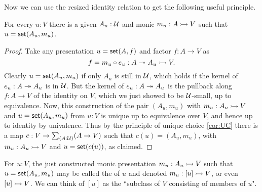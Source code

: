 Now we can use the resized identity relation to get the following useful principle.

\begin{lem}\label{lem:MonicSetPresent}
For every $u:V$ there is a given $A_u:\mathcal{U}$ and monic $m_u: A \rightarrowtail V$ such that $u = \mathsf{set}(A_u, m_u)$.
\end{lem}

\begin{proof}
Take any presentation $u = \mathsf{set}(A,f)$ and factor $f:A\to V$ as $$f = m_u\circ e_u : A \twoheadrightarrow A_u \rightarrowtail V.$$  Clearly $u = \mathsf{set}(A_u, m_u)$ if only $A_u$ is still in $\mathcal{U}$, which holds if the kernel of $e_u : A \twoheadrightarrow A_u$ is in $\mathcal{U}$.  But the kernel of $e_u : A \twoheadrightarrow A_u$ is the pullback along $f : A\to V$ of the identity on $V$, which we just showed to be $\mathcal{U}$-small, up to equivalence.  Now, this construction of the pair $(A_u, m_u)$ with $m_u :A_u \rightarrowtail V$ and $u = \mathsf{set}(A_u, m_u)$ from $u:V$ is unique up to equivalence over $V$, and hence up to identity by univalence.  Thus by the principle of unique choice \eqref{cor:UC} there is a map $c : V\to\sm{A:\UU}(A\to V)$ such that $c(u) = (A_u, m_u)$, with $m_u :A_u \rightarrowtail V$ and $u = \mathsf{set}(c(u))$, as claimed.
\end{proof}

\begin{defn}\label{def:TypeOfElements}
For $u:V$, the just constructed monic presentation $m_u: A_u \rightarrowtail V$ such that $u = \mathsf{set}(A_u, m_u)$ may be called the  of $u$ and denoted $m_u : [u] \rightarrowtail V$, or even $[u] \rightarrowtail V$.  We can think of $[u]$ as the ``subclass of $V$ consisting of members of $u$".
\end{defn}

